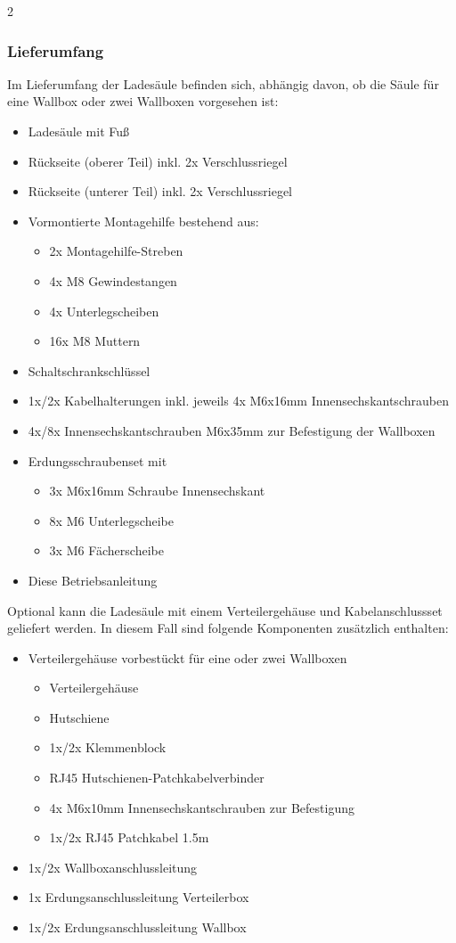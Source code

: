 \documentclass[a4paper,10pt]{article}
\begin{document}
\begin{multicols}{2}
	\subsubsection{Lieferumfang}
	Im Lieferumfang der Ladesäule befinden sich, abhängig davon, ob die Säule für eine
	Wallbox oder zwei Wallboxen vorgesehen ist:
	\begin{itemize}
		\item Ladesäule mit Fuß
		\item Rückseite (oberer Teil) inkl. 2x Verschlussriegel
		\item Rückseite (unterer Teil) inkl. 2x Verschlussriegel
		\item Vormontierte Montagehilfe bestehend aus:
			\begin{itemize}
				\item 2x Montagehilfe-Streben
				\item 4x M8 Gewindestangen
				\item 4x Unterlegscheiben
				\item 16x M8 Muttern
			\end{itemize}
		\item Schaltschrankschlüssel
		\item 1x/2x Kabelhalterungen inkl. jeweils 4x M6x16mm Innensechskantschrauben
		\item 4x/8x Innensechskantschrauben M6x35mm zur Befestigung der Wallboxen
		\item Erdungsschraubenset mit
		\begin{itemize}
			\item 3x M6x16mm Schraube Innensechskant
			\item 8x M6 Unterlegscheibe
			\item 3x M6 Fächerscheibe
		\end{itemize}
		\item Diese Betriebsanleitung
	\end{itemize}

	Optional kann die Ladesäule mit einem Verteilergehäuse und Kabelanschlussset
	geliefert werden. In diesem Fall sind folgende Komponenten zusätzlich
	enthalten:
	\begin{itemize}
		\item Verteilergehäuse vorbestückt für eine oder zwei Wallboxen
				\begin{itemize}
				\item Verteilergehäuse
				\item Hutschiene
				\item 1x/2x Klemmenblock
				\item RJ45 Hutschienen-Patchkabelverbinder
				\item 4x M6x10mm Innensechskantschrauben zur Befestigung
				\item 1x/2x RJ45 Patchkabel 1.5m
			\end{itemize}
			\item 1x/2x Wallboxanschlussleitung
			\item 1x Erdungsanschlussleitung Verteilerbox
			\item 1x/2x Erdungsanschlussleitung Wallbox
	\end{itemize}
\vspace{-0.1cm}

\end{multicols}
\end{document}
